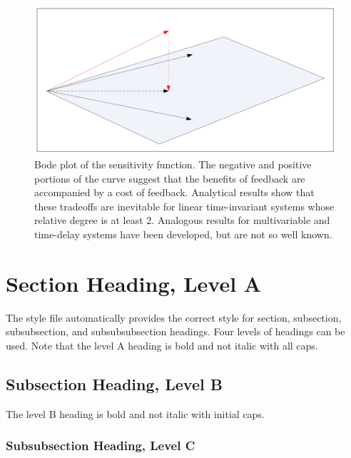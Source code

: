 \documentclass[letterpaper,12pt,peerreviewca,draftcls]{IEEEtran}
\begin{document}
\begin{figure}[t]
\centering
\includegraphics[scale=0.5]{sensitivity}
\caption{Bode plot of the sensitivity function.  The negative and
  positive portions of the curve suggest that the benefits of feedback
  are accompanied by a cost of feedback.  Analytical results show that
  these tradeoffs are inevitable for linear time-invariant systems whose
  relative degree is at least 2.  Analogous results for multivariable
  and time-delay systems have been developed, but are not so well
  known.}
\label{fig2}
\end{figure}














\section{Section Heading, Level A}


The style file automatically provides the correct style for
section, subsection, subsubsection, and subsubsubsection headings.
Four levels of headings can be used.  Note that the level A
heading is bold and not italic with all caps.


\subsection{Subsection Heading, Level B}


The level B heading is bold and not italic with initial caps.


\subsubsection{Subsubsection Heading, Level C}
\end{document}
